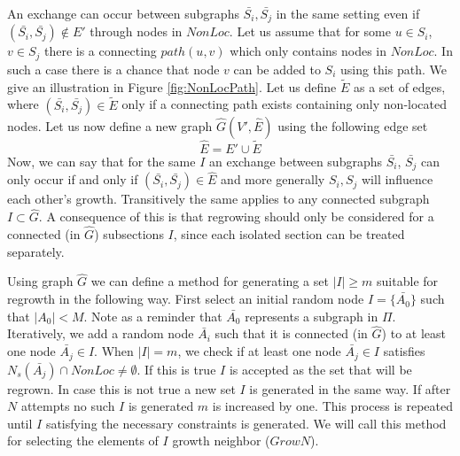 An exchange can occur between subgraphs $\bar{S_i}, \bar{S_j}$ in the same setting even if $(\bar{S_i},\bar{S_j}) \notin E'$  through nodes in $NonLoc$.     Let us assume that for some $u \in S_i$, $v \in S_j$ there is a connecting $path(u,v)$ which only contains nodes in $NonLoc$. In such a case there is a chance that node $v$ can be added to $S_i$ using this path. We give an illustration   in Figure \ref{fig:NonLocPath}. Let us define $\tilde{E}$ as a set of edges, where  $(\bar{S_i},\bar{S_j}) \in \tilde{E}$ only if a connecting path exists containing only  non-located nodes.  Let us now define a new graph $\hat{G}(V', \hat{E})$ using the following edge set 
\begin{equation}
\hat{E} = E' \cup  \tilde{E}
\end{equation} 
Now, we can say that for the same $I$ an exchange between subgraphs $\bar{S_i}$, $\bar{S_j}$  can only occur if and only if $(\bar{S_i}, \bar{S_j}) \in \hat{E}$ and more generally $S_i, S_j$ will influence each other's growth. Transitively the same applies to any connected subgraph $I \subset \hat{G}$. A consequence of this is that  regrowing should only be considered for a connected (in $\hat{G}$) subsections  $I$, since each isolated section can be treated separately. 

Using graph $\hat{G}$ we can define a method for generating a set $|I| \geq m$ suitable for regrowth in the following way. First select an initial  random node $I = \{\bar{A_0}\}$ such that $|A_0| <M$. Note as a reminder that $\bar{A_0}$ represents a subgraph in $\Pi$. Iteratively, we add a random node $\bar{A_i}$ such that it is connected (in $\hat{G}$) to at least one node  $\bar{A_j} \in I$. When $|I|=m$, we check if at least one node $\bar{A_j} \in I$  satisfies  $N_s(\bar{A_j}) \cap NonLoc \neq \emptyset$. If this is true  $I$ is accepted as the set that will be regrown. In case this is not true a new set $I$ is generated in the same way. If after $N$ attempts no such $I$ is generated $m$ is increased by one. This process is repeated until $I$ satisfying the necessary constraints is generated.  We will call this method for selecting the elements of $I$ growth neighbor ($GrowN$).

